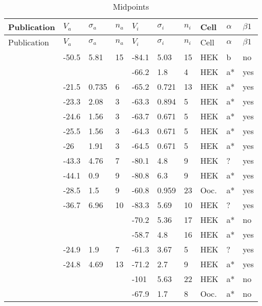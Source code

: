 \begin{footnotesize}
\startrowcolors
\begin{longtable}{p{5cm}|lll|lll|lll}
\caption{\label{midpoints}Midpoints} \\
\hline
Publication & $V_a$ & $\sigma_a$  & $n_a$ & $V_i$ & $\sigma_i$  & $n_i$ & Cell & $\alpha$ & $\beta1$ \\
\hline
\endfirsthead\hline
\rowcolor{white}
Publication & $V_a$ & $\sigma_a$  & $n_a$ & $V_i$ & $\sigma_i$  & $n_i$ & Cell & $\alpha$ & $\beta1$ \\
\hline
\endhead
\hline
\endfoot
\citet{Abe2014MutationDB} & -50.5 & 5.81 & 15 & -84.1 & 5.03 & 15 & HEK & b & no \\
\citet{Abriel2000MutationDB} & && & -66.2 & 1.8 & 4 & HEK & a* & yes \\
\citet{Abriel2001MutationDB} & -21.5 & 0.735 & 6 & -65.2 & 0.721 & 13 & HEK & a* & yes \\
\citet{Abriel2001MutationDB} & -23.3 & 2.08 & 3 & -63.3 & 0.894 & 5 & HEK & a* & yes \\
\citet{Abriel2001MutationDB} & -24.6 & 1.56 & 3 & -63.7 & 0.671 & 5 & HEK & a* & yes \\
\citet{Abriel2001MutationDB} & -25.5 & 1.56 & 3 & -64.3 & 0.671 & 5 & HEK & a* & yes \\
\citet{Abriel2001MutationDB} & -26 & 1.91 & 3 & -64.5 & 0.671 & 5 & HEK & a* & yes \\
\citet{Aiba2014MutationDB} & -43.3 & 4.76 & 7 & -80.1 & 4.8 & 9 & HEK & ? & yes \\
\citet{Akai2000MutationDB} & -44.1 & 0.9 & 9 & -80.8 & 6.3 & 9 & HEK & a* & yes \\
\citet{Albert2008MutationDB} & -28.5 & 1.5 & 9 & -60.8 & 0.959 & 23 & Ooc. & a* & yes \\
\citet{Amin2005MutationDB} & -36.7 & 6.96 & 10 & -83.3 & 5.69 & 10 & HEK & ? & yes \\
\citet{An1998MutationDB} & && & -70.2 & 5.36 & 17 & HEK & a* & no \\
\citet{An1998MutationDB} & && & -58.7 & 4.8 & 16 & HEK & a* & yes \\
\citet{Bankston2007aMutationDB} & -24.9 & 1.9 & 7 & -61.3 & 3.67 & 5 & HEK & ? & yes \\
\citet{Bankston2007bMutationDB} & -24.8 & 4.69 & 13 & -71.2 & 2.7 & 9 & HEK & a* & yes \\
\citet{Baroudi2000aMutationDB} & && & -101 & 5.63 & 22 & HEK & a* & no \\
\citet{Baroudi2000aMutationDB} & && & -67.9 & 1.7 & 8 & Ooc. & a* & no \\

\end{longtable}
\end{footnotesize}
